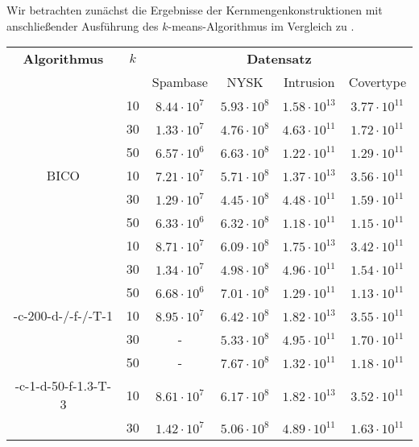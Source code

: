 Wir betrachten zunächst die Ergebnisse der Kernmengenkonstruktionen mit anschließender Ausführung des $k$-means-Algorithmus im
Vergleich zu \kmpp.
\newpage
\begin{table}[h]
\centering
\begin{tabular}{@{}cccccc@{}} \toprule
	\textbf{Algorithmus} & $k$ & \multicolumn{4}{c}{\textbf{Datensatz}} \\
	\cmidrule(r){3-6} & 		& Spambase 				& NYSK 				& Intrusion 			& Covertype \\ \toprule
	\Skmpp 						& 10 & $8.44 \cdot 10^7$ & $5.93 \cdot 10^8$ & $1.58 \cdot 10^{13}$ & $3.77 \cdot 10^{11}$ \\
		 						& 30 & $1.33 \cdot 10^7$ & $4.76 \cdot 10^8$ & $4.63 \cdot 10^{11}$ & $1.72 \cdot 10^{11}$ \\
		 						& 50 & $6.57 \cdot 10^6$ & $6.63 \cdot 10^8$ & $1.22 \cdot 10^{11}$ & $1.29 \cdot 10^{11}$ \\
	\midrule
	BICO 						& 10 & $7.21 \cdot 10^7$ & $5.71 \cdot 10^8$ & $1.37 \cdot 10^{13}$ & $3.56 \cdot 10^{11}$ \\
			 					& 30 & $1.29 \cdot 10^7$ & $4.45 \cdot 10^8$ & $4.48 \cdot 10^{11}$ & $1.59 \cdot 10^{11}$ \\
		 						& 50 & $6.33 \cdot 10^6$ & $6.32 \cdot 10^8$ & $1.18 \cdot 10^{11}$ & $1.15 \cdot 10^{11}$ \\
	\midrule
	\kmpp 						& 10 & $8.71 \cdot 10^7$ & $6.09 \cdot 10^8$ & $1.75 \cdot 10^{13}$ & $3.42 \cdot 10^{11}$ \\
			 					& 30 & $1.34 \cdot 10^7$ & $4.98 \cdot 10^8$ & $4.96 \cdot 10^{11}$ & $1.54 \cdot 10^{11}$ \\
		 						& 50 & $6.68 \cdot 10^6$ & $7.01 \cdot 10^8$ & $1.29 \cdot 10^{11}$ & $1.13 \cdot 10^{11}$ \\
	\midrule
	\CsTwo-c-200-d-/-f-/-T-1	& 10 & $8.95 \cdot 10^7$ & $6.42 \cdot 10^8$ & $1.82 \cdot 10^{13}$ & $3.55 \cdot 10^{11}$ \\
			 					& 30 & - 				& $5.33 \cdot 10^8$ & $4.95 \cdot 10^{11}$ & $1.70 \cdot 10^{11}$ \\
		 						& 50 & - 				& $7.67 \cdot 10^8$	& $1.32 \cdot 10^{11}$ & $1.18 \cdot 10^{11}$ \\
	\midrule
	\CsTwo-c-1-d-50-f-1.3-T-3	& 10 & $8.61 \cdot 10^7$ & $6.17 \cdot 10^8$ & $1.82 \cdot 10^{13}$ & $3.52 \cdot 10^{11}$ \\
			 					& 30 & $1.42 \cdot 10^7$ & $5.06 \cdot 10^8$ & $4.89 \cdot 10^{11}$ & $1.63 \cdot 10^{11}$ \\

\end{tabular}
\end{table}
